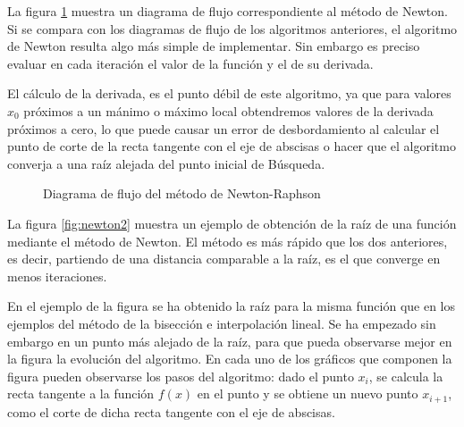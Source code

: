 La figura \ref{fig:newton} muestra un diagrama de flujo correspondiente al método de Newton. Si se compara con los diagramas de flujo de los algoritmos anteriores, el algoritmo de Newton resulta algo más simple de implementar. Sin embargo es preciso evaluar en cada iteración el valor de la función y el de su derivada. 

El cálculo de la derivada, es el punto débil de este algoritmo, ya que para valores $x_0$ próximos a un mánimo o máximo local obtendremos valores de la derivada próximos a cero, lo que puede causar un error de desbordamiento al calcular el punto de corte de la recta tangente con el eje de abscisas o hacer que el algoritmo converja a una raíz alejada del punto inicial de Búsqueda.
 
\begin{figure}[h]
\centering
{}
\caption{Diagrama de flujo del método de Newton-Raphson}
\label{fig:newton}
\end{figure}

La figura \ref{fig:newton2} muestra un ejemplo de obtención de la raíz de una función mediante el método de Newton. El método es más rápido que los dos anteriores, es decir, partiendo de una distancia comparable a la raíz, es el que converge en menos iteraciones. 

En el ejemplo de la figura se ha obtenido la raíz para la misma función que en los ejemplos del método de la bisección e interpolación lineal. Se ha empezado sin embargo en un punto más alejado de la raíz, para que pueda observarse mejor en la figura la evolución del algoritmo. En cada uno de los gráficos que componen la figura pueden observarse  los pasos del algoritmo: dado el punto  $x_i$, se calcula  la recta tangente a la función $f(x)$ en el punto y se obtiene un nuevo punto $x_{i+1}$,  como el corte de dicha recta tangente con el eje de abscisas.

